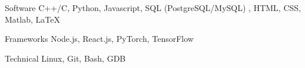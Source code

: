 

\begin{cvskills}

  \cvskill
    {Software} %
    {C++/C, Python, Javascript, SQL (PostgreSQL/MySQL) , HTML, CSS, Matlab, LaTeX} %

  \cvskill
    {Frameworks} %
    {Node.js, React.js, PyTorch, TensorFlow} %

  \cvskill
    {Technical} %
    {Linux, Git, Bash, GDB} %

\end{cvskills}
